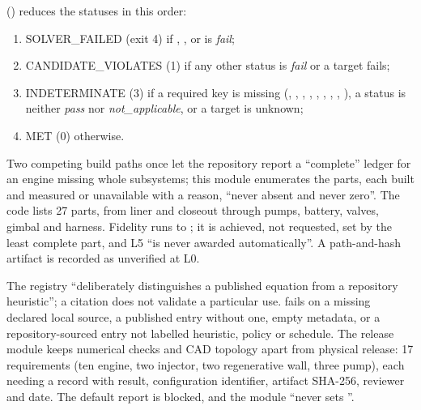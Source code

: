  () reduces the statuses in this order:
\begin{enumerate}[itemsep=0pt]
\item SOLVER\_FAILED (exit 4) if , ,  or  is \emph{fail};
\item CANDIDATE\_VIOLATES (1) if any other status is \emph{fail} or a target fails;
\item INDETERMINATE (3) if a required key is missing (, , , , , , , , ), a status is neither \emph{pass} nor \emph{not\_applicable}, or a target is unknown;
\item MET (0) otherwise.
\end{enumerate}

Two competing build paths once let the repository report a ``complete'' ledger for an engine missing whole subsystems; this module enumerates the parts, each built and measured or unavailable with a reason, ``never absent and never zero''. The code lists 27 parts, from liner and closeout through pumps, battery, valves, gimbal and harness. Fidelity runs  to ; it is achieved, not requested, set by the least complete part, and L5 ``is never awarded automatically''. A path-and-hash artifact is recorded as unverified at L0.

The registry ``deliberately distinguishes a published equation from a repository heuristic''; a citation does not validate a particular use.  fails on a missing declared local source, a published entry without one, empty metadata, or a repository-sourced entry not labelled heuristic, policy or schedule. The release module keeps numerical checks and CAD topology apart from physical release: 17 requirements (ten engine, two injector, two regenerative wall, three pump), each needing a record with result, configuration identifier, artifact SHA-256, reviewer and date. The default report is blocked, and the module ``never sets ''.

